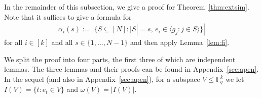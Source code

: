 \documentclass[11pt,a4paper,reqno,twoside]{amsart}
\theoremstyle{definition}
\newtheorem{lemma}{Lemma}
\newcommand{\F}{\mathbb{F}}
\newcommand\qbin[3]{\left[\begin{matrix} #1 \\ #2 \end{matrix}\right]_{#3}}
\begin{document}
In the remainder of this subsection, we give a proof for Theorem~\ref{thm:extsim}. Note that it suffices to give a formula for 
\begin{align*}
\alpha_i(s) := {|\{S \subseteq [N] : |S| = s, \, e_i \in \langle g_j : j \in S\rangle \}|}
\end{align*}
for all $i \in [k]$ and all $s \in \{1, \ldots, N-1\}$
and then apply Lemma~\ref{lem:fi}.

We split the proof into four parts, the first three of which are 
independent lemmas. The three lemmas and their proofs can be found in Appendix~\ref{sec:apen}.
In the sequel (and also in Appendix~\ref{sec:apen}), for a subspace $V \le \F_q^k$ we let $I(V)=\{t : e_t \in V\}$ and $\omega(V)=|I(V)|$. 

\end{document}

